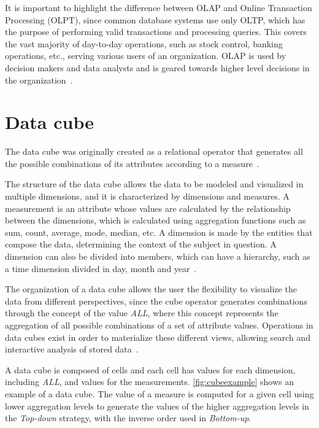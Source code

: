 It is important to highlight the difference between OLAP and Online Transaction Processing (OLPT), since common database systems use only OLTP, which has the purpose of performing valid transactions and processing queries.
This covers the vast majority of day-to-day operations, such as stock control, banking operations, etc., serving various users of an organization.
OLAP is used by decision makers and data analysts and is geared towards higher level decisions in the organization~\cite{hanDataMiningConcepts2011}.

\section{Data cube}\label{ch:fun:cube}

The data cube was originally created as a relational operator that generates all the possible combinations of its attributes according to a measure~\cite{grayDataCubeRelational1996}.

The structure of the data cube allows the data to be modeled and visualized in multiple dimensions, and it is characterized by dimensions and measures.
A measurement is an attribute whose values are calculated by the relationship between the dimensions, which is calculated using aggregation functions such as sum, count, average, mode, median, etc.
A dimension is made by the entities that compose the data, determining the context of the subject in question.
A dimension can also be divided into members, which can have a hierarchy, such as a time dimension divided in day, month and year~\cite{hanDataMiningConcepts2011}.

The organization of a data cube allows the user the flexibility to visualize the data from different perspectives, since the cube operator generates combinations through the concept of the value \textit{ALL}, where this concept represents the aggregation of all possible combinations of a set of attribute values.
Operations in data cubes exist in order to materialize these different views, allowing search and interactive analysis of stored data~\cite{hanDataMiningConcepts2011}.

A data cube is composed of cells and each cell has values for each dimension, including \textit{ALL}, and values for the measurements.
\autoref{fig:cubeexample} shows an example of a data cube.
The value of a measure is computed for a given cell using lower aggregation levels to generate the values of the higher aggregation levels in the \textit{Top-down} strategy, with the inverse order used in \textit{Bottom-up}.

